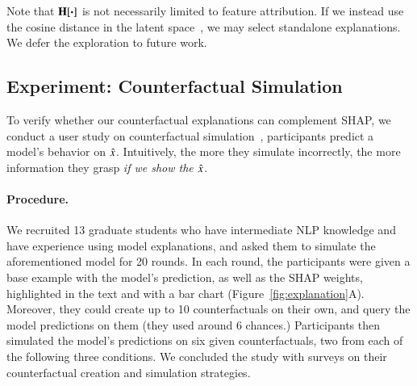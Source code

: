 Note that $\operatorname*{\mathbf{H}}[\boldsymbol{\cdot}]$ is not necessarily limited to feature attribution.
If we instead use the cosine distance in the latent space~\cite{reimers-2019-sentence-bert}, we may select standalone explanations.
We defer the exploration to future work.


\subsection{Experiment: Counterfactual Simulation}
\label{subsec:exp_user_study}

To verify whether our counterfactual explanations can complement SHAP, we conduct a user study on counterfactual simulation~\cite{hase2020evaluating}, \ie participants predict a model's behavior on $\hat{x}$.
Intuitively, the more they simulate incorrectly, the more information they grasp \emph{if we show the $\hat{x}$}.


\paragraph{Procedure.}
We recruited 13 graduate students who have intermediate NLP knowledge and have experience using model explanations, and asked them to simulate the aforementioned \qqp model for 20 rounds.
In each round, the participants were given a base example with the model's prediction, as well as the SHAP weights, highlighted in the text and with a bar chart (Figure~\ref{fig:explanation}A).
Moreover, they could create up to 10 counterfactuals on their own, and query the model predictions on them (they used around 6 chances.)
Participants then simulated the model's predictions on six given counterfactuals, two from each of the following three conditions.
We concluded the study with surveys on their counterfactual creation and simulation strategies.

